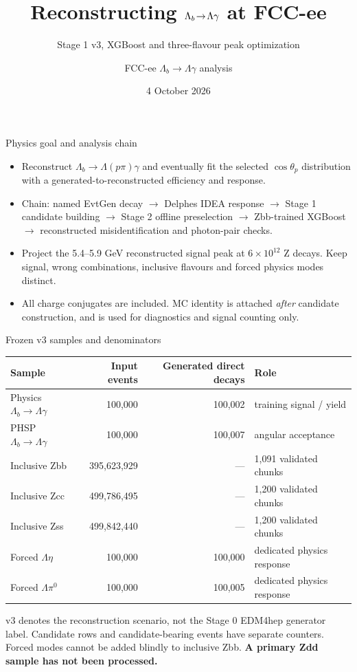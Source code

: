 \documentclass[aspectratio=169,10pt]{beamer}
\title{Reconstructing $\Lg$ at FCC-ee}
\subtitle{Stage 1 v3, XGBoost and three-flavour peak optimization}
\author{FCC-ee $\Lambda_b\to\Lambda\gamma$ analysis}
\date{4 October 2026}
\newcommand{\Lg}{\Lambda_b\!\to\!\Lambda\gamma}
\newcommand{\ct}{\cos\theta_p}
\begin{document}
\frame{\titlepage}

\begin{frame}{Physics goal and analysis chain}
\begin{itemize}
\item Reconstruct $\Lambda_b\to\Lambda(p\pi)\gamma$ and eventually fit the selected $\ct$ distribution with a generated-to-reconstructed efficiency and response.
\item Chain: named EvtGen decay $\to$ Delphes IDEA response $\to$ Stage 1 candidate building $\to$ Stage 2 offline preselection $\to$ Zbb-trained XGBoost $\to$ reconstructed misidentification and photon-pair checks.
\item Project the 5.4--5.9 GeV reconstructed signal peak at $6\times10^{12}$ Z decays. Keep signal, wrong combinations, inclusive flavours and forced physics modes distinct.
\item All charge conjugates are included. MC identity is attached \emph{after} candidate construction, and is used for diagnostics and signal counting only.
\end{itemize}
\end{frame}

\begin{frame}{Frozen v3 samples and denominators}
\small\begin{tabular}{lrrl}
\toprule
Sample & Input events & Generated direct decays & Role\\\midrule
Physics $\Lg$ & 100,000 & 100,002 & training signal / yield\\
PHSP $\Lg$ & 100,000 & 100,007 & angular acceptance\\
Inclusive Zbb & 395,623,929 & --- & 1,091 validated chunks\\
Inclusive Zcc & 499,786,495 & --- & 1,200 validated chunks\\
Inclusive Zss & 499,842,440 & --- & 1,200 validated chunks\\
Forced $\Lambda\eta$ & 100,000 & 100,000 & dedicated physics response\\
Forced $\Lambda\pi^0$ & 100,000 & 100,005 & dedicated physics response\\
\bottomrule\end{tabular}
\vspace{.5em}

\scriptsize v3 denotes the reconstruction scenario, not the Stage 0 EDM4hep generator label. Candidate rows and candidate-bearing events have separate counters. Forced modes cannot be added blindly to inclusive Zbb. \textbf{A primary Zdd sample has not been processed.}
\end{frame}
\end{document}
